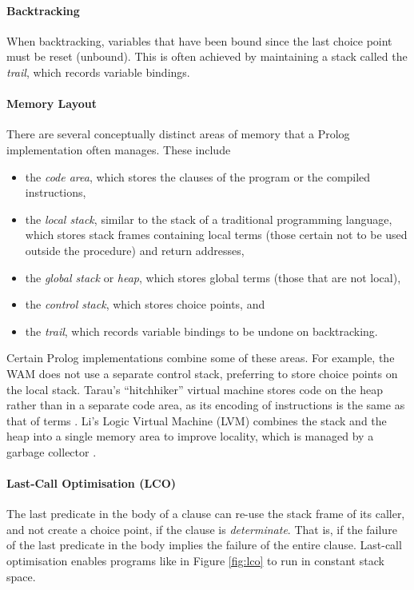 \paragraph{Backtracking} When backtracking, variables that have been bound since the last choice point must be reset (unbound). This is often achieved by maintaining a stack called the \emph{trail}, which records variable bindings.

\paragraph{Memory Layout} There are several conceptually distinct areas of memory that a Prolog implementation often manages. These include

\begin{itemize}
\item the \emph{code area}, which stores the clauses of the program or the compiled instructions,
\item the \emph{local stack}, similar to the stack of a traditional programming language, which stores stack frames containing local terms (those certain not to be used outside the procedure) and return addresses,
\item the \emph{global stack} or \emph{heap}, which stores global terms (those that are not local),
\item the \emph{control stack}, which stores choice points, and
\item the \emph{trail}, which records variable bindings to be undone on backtracking.
\end{itemize}

Certain Prolog implementations combine some of these areas. For example, the WAM does not use a separate control stack, preferring to store choice points on the local stack. Tarau's ``hitchhiker'' virtual machine stores code on the heap rather than in a separate code area, as its encoding of instructions is the same as that of terms \cite{tarauHitchhikersGuideReinventing2018}. Li's Logic Virtual Machine (LVM) combines the stack and the heap into a single memory area to improve locality, which is managed by a garbage collector \cite{liEfficientMemoryManagement2000}.

\paragraph{Last-Call Optimisation (LCO)} The last predicate in the body of a clause can re-use the stack frame of its caller, and not create a choice point, if the clause is \emph{determinate}. That is, if the failure of the last predicate in the body implies the failure of the entire clause. Last-call optimisation enables programs like in Figure \ref{fig:lco} to run in constant stack space.


